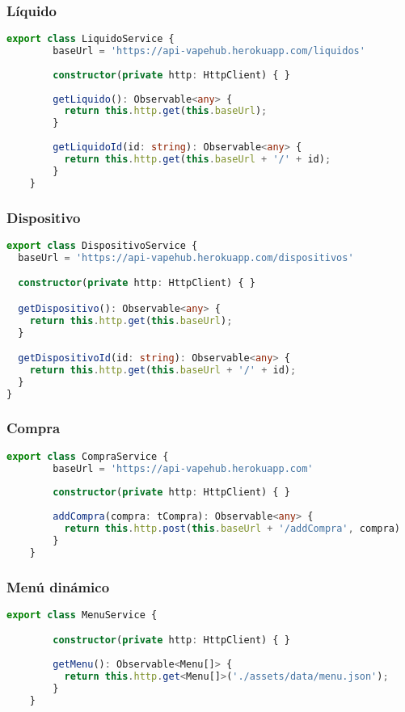 \documentclass[a4paper]{article} %
\begin{document}
\subsubsection{Líquido}
\begin{lstlisting}[language=Typescript]
	export class LiquidoService {
		baseUrl = 'https://api-vapehub.herokuapp.com/liquidos'
	  
		constructor(private http: HttpClient) { }
	  
		getLiquido(): Observable<any> {
		  return this.http.get(this.baseUrl);
		}
	  
		getLiquidoId(id: string): Observable<any> {
		  return this.http.get(this.baseUrl + '/' + id);
		}
	}
\end{lstlisting}
\subsubsection{Dispositivo}
\begin{lstlisting}[language=Typescript]
	export class DispositivoService {
  baseUrl = 'https://api-vapehub.herokuapp.com/dispositivos'

  constructor(private http: HttpClient) { }

  getDispositivo(): Observable<any> {
    return this.http.get(this.baseUrl);
  }

  getDispositivoId(id: string): Observable<any> {
    return this.http.get(this.baseUrl + '/' + id);
  }
}
\end{lstlisting}
\subsubsection{Compra}
\begin{lstlisting}[language=Typescript]
	export class CompraService {
		baseUrl = 'https://api-vapehub.herokuapp.com'
	  
		constructor(private http: HttpClient) { }
	  
		addCompra(compra: tCompra): Observable<any> {
		  return this.http.post(this.baseUrl + '/addCompra', compra)
		}
	}
\end{lstlisting}
\subsubsection{Menú dinámico}
\begin{lstlisting}[language=Typescript]
	export class MenuService {

		constructor(private http: HttpClient) { }
	  
		getMenu(): Observable<Menu[]> {
		  return this.http.get<Menu[]>('./assets/data/menu.json');
		}
	}
\end{lstlisting}\clearpage
\end{document}

